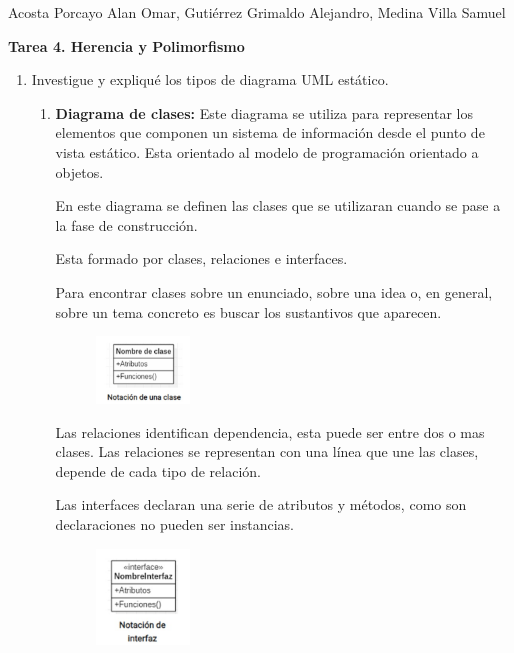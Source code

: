 \documentclass[12pt]{article}
\newcommand{\linejump}{\hfill \break}
\begin{document}
  \begin{center}
    Acosta Porcayo Alan Omar, Gutiérrez Grimaldo Alejandro, Medina Villa Samuel

    \LARGE \textbf{Tarea 4. Herencia y Polimorfismo}
  \end{center}

  \linejump
  \begin{enumerate}[label = \arabic{enumi}]
    \item Investigue y expliqué los tipos de diagrama UML estático.
    \begin{enumerate}[label=\arabic{enumi}.\arabic{enumii}]
      \item \textbf{Diagrama de clases:} Este diagrama se utiliza para representar los elementos que componen un sistema de información desde el punto de vista estático. Esta orientado al modelo de programación orientado a objetos.
      
      En este diagrama se definen las clases que se utilizaran cuando se pase a la fase de construcción.
      
      Esta formado por clases, relaciones e interfaces.
      
      Para encontrar clases sobre un enunciado, sobre una idea o, en general, sobre un tema concreto es buscar los sustantivos que aparecen.

      \begin{figure}[ht]
        \includegraphics[width = 0.25\textwidth, center]{clase.jpg}
      \end{figure}
      
      Las relaciones identifican dependencia, esta puede ser entre dos o mas clases. Las relaciones se representan con una línea que une las clases, depende de cada tipo de relación.

      Las interfaces declaran una serie de atributos y métodos, como son declaraciones no pueden ser instancias.

      \begin{figure}[ht]
        \includegraphics[width = 0.25\textwidth, center]{interface.jpg}
      \end{figure}


\end{enumerate}
\end{enumerate}
\end{document}

